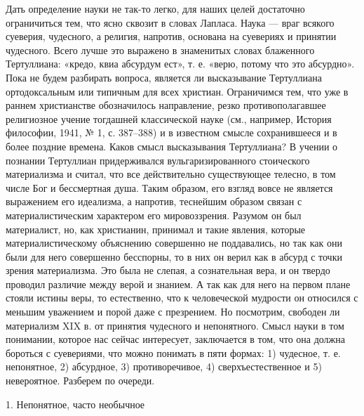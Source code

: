 Дать определение  науки не  так-то легко,  для наших  целей достаточно
ограничиться  тем,  что  ясно  сквозит в  словах  Лапласа.  Наука  ---
враг  всякого суеверия,  чудесного, а  религия, напротив,  основана на
суевериях и принятии чудесного. Всего  лучше это выражено в знаменитых
словах  блаженного  Тертуллиана: «кредо,  квиа  абсурдум  ест», т.  е.
«верю,  потому что  это абсурдно».  Пока не  будем разбирать  вопроса,
является  ли  высказывание  Тертуллиана  ортодоксальным  или  типичным
для  всех христиан.  Ограничимся тем,  что уже  в раннем  христианстве
обозначилось направление,  резко противополагавшее  религиозное учение
тогдашней классической науке (см.,  например, История философии, 1941,
№  1, с.  387--388)  и  в известном  смысле  сохранившееся  и в  более
поздние  времена.  Каков  смысл  высказывания  Тертуллиана?  В  учении
о  познании Тертуллиан  придерживался вульгаризированного  стоического
материализма и  считал, что все действительно  существующее телесно, в
том числе Бог  и бессмертная душа. Таким образом, его  взгляд вовсе не
является  выражением  его  идеализма, а  напротив,  теснейшим  образом
связан с  материалистическим характером его мировоззрения.  Разумом он
был материалист, но, как христианин, принимал и такие явления, которые
материалистическому объяснению  совершенно не поддавались, но  так как
они были для него совершенно бесспорны, то в них он верил как в абсурд
с точки зрения материализма. Это  была не слепая, а сознательная вера,
и он  твердо проводил различие  между верой и  знанием. А так  как для
него  на  первом плане  стояли  истины  веры,  то естественно,  что  к
человеческой мудрости он относился с  меньшим уважением и порой даже с
презрением. Но посмотрим,  свободен ли материализм XIX  в. от принятия
чудесного  и непонятного.  Смысл науки  в том  понимании, которое  нас
сейчас  интересует,  заключается в  том,  что  она должна  бороться  с
суевериями,  что можно  понимать в  пяти  формах: 1)  чудесное, т.  е.
непонятное, 2)  абсурдное, 3) противоречивое, 4)  сверхъестественное и
5) невероятное. Разберем по очереди.

1. Непонятное, часто необычное

